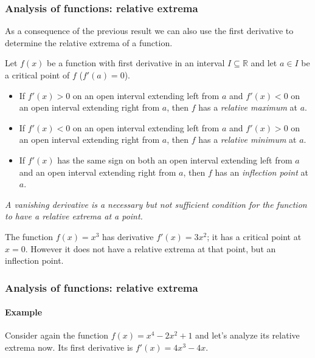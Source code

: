 \begin{frame}
\frametitle{Analysis of functions: relative extrema}
As a consequence of the previous result we can also use the first derivative to determine the relative extrema of a function. 
\begin{theorem}
Let $f(x)$ be a function with first derivative in an interval $I\subseteq \mathbb{R}$ and let $a\in I$ be a critical point of $f$ ($f'(a)=0$).
\begin{itemize}
\item  If $f'(x)>0$ on an open interval extending left from $a$ and $f'(x)<0$ on an open interval extending right from $a$, then $f$ has a \emph{relative maximum} at $a$.
\item  If $f'(x)<0$ on an open interval extending left from $a$ and $f'(x)>0$ on an open interval extending right from $a$, then $f$ has a \emph{relative minimum} at $a$.
\item If $f'(x)$ has the same sign on both an open interval extending left from $a$ and an open interval extending right from $a$, then $f$ has an \emph{inflection point} at $a$.
\end{itemize}
\end{theorem}

 \emph{A vanishing derivative is a necessary but not sufficient condition for the function to have a relative extrema at a point.}

 The function $f(x)=x^3$ has derivative $f'(x)=3x^2$; it has a critical point at $x=0$.
However it does not have a relative extrema at that point, but an inflection point.
\end{frame}


\begin{frame}
\frametitle{Analysis of functions: relative extrema}
\framesubtitle{Example}
Consider again the function $f(x)=x^4-2x^2+1$ and let's analyze its relative extrema now. 
Its first derivative is $f'(x)=4x^3-4x$.
\begin{center}
\scalebox{0.9}{}
\end{center}
\end{frame}


